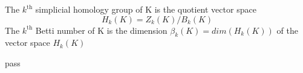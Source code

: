 \begin{definition}
The $k^{\text{th}}$ simplicial homology group of K is the quotient vector space $$H_k(K) = Z_k(K)/B_k(K)$$
The $k^{\text{th}}$ Betti number of K is the dimension $\beta_k(K) = dim(H_k(K))$ of the vector space $H_k(K)$
\end{definition}


\begin{theorem}
pass
\end{theorem}